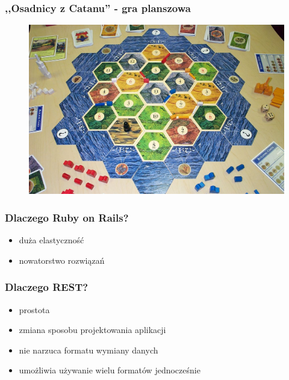 \documentclass[12pt]{beamer}
\begin{document}
\begin{frame}
  \frametitle{,,Osadnicy z Catanu'' - gra planszowa}
  \begin{figure}
    \includegraphics[width=\linewidth]{settlers.jpg}
  \end{figure}
\end{frame}

\begin{frame}
  \frametitle{Dlaczego Ruby on Rails?}
  \begin{itemize}
  \item duża elastyczność
  \item nowatorstwo rozwiązań
  \end{itemize}
\end{frame}

\begin{frame}[fragile]
  \frametitle{Dlaczego REST?}
  \begin{itemize}
  \item prostota
  \item zmiana sposobu projektowania aplikacji
  \item nie narzuca formatu wymiany danych
  \item umożliwia używanie wielu formatów jednocześnie
  \end{itemize}
\end{frame}
\end{document}
